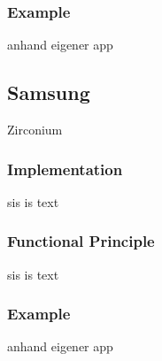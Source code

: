 \subsubsection{Example}\label{subsection:lvl-google-example}
anhand eigener app
\subsection{Samsung}\label{subsection:lvl-samsung}
Zirconium
\subsubsection{Implementation}\label{subsection:lvl-samsung-implementation}
sis is text
\subsubsection{Functional Principle}\label{subsection:lvl-samsung-functional}
sis is text
\subsubsection{Example}\label{subsection:lvl-samsung-example}
anhand eigener app
